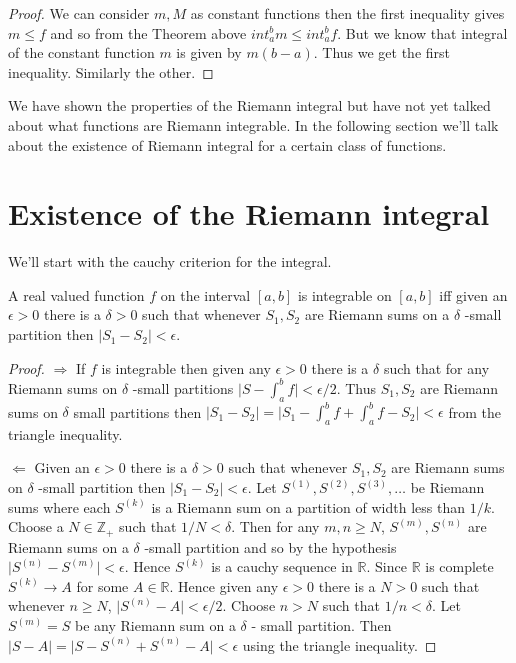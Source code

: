 \begin{proof}
    We can consider $m,M$ as constant functions then the first inequality gives $m \leq f$ and so
    from the Theorem above $int_a^b m \leq int_a^b f$. But we know that integral of the constant 
    function $m$ is given by $m(b-a)$. Thus we get the first inequality. Similarly the other.
\end{proof}
We have shown the properties of the Riemann integral but have not yet talked about what functions
are Riemann integrable. In the following section we'll talk about the existence of Riemann integral
for a certain class of functions.

\section{Existence of the Riemann integral}
We'll start with the cauchy criterion for the integral.
\begin{Lemma}
    A real valued function $f$ on the interval $\left[a,b\right]$ is integrable on
    $\left[a,b\right]$ iff given an $\epsilon > 0$ there is a $\delta > 0$ such that whenever 
    $S_1,S_2$ are Riemann sums on a $\delta$ -small partition then $\lvert S_1-S_2\rvert <
    \epsilon$. 
\end{Lemma}
\begin{proof}
    $\Rightarrow$ If $f$ is integrable then given any $\epsilon > 0$ there is a $\delta$ such that
for any Riemann sums on $\delta$ -small partitions $\lvert S - \int_a^b f \rvert < \epsilon/2$. Thus
$S_1,S_2$ are Riemann sums on $\delta$ small partitions then $\lvert S_1 - S_2 \rvert = \lvert S_1 -
\int_a^b f + \int_a^b f - S_2 \rvert < \epsilon $ from the triangle inequality.

$\Leftarrow$ Given an $\epsilon > 0$ there is a $\delta > 0$ such that whenever $S_1,S_2$ are
    Riemann sums on $\delta$ -small partition then $\lvert S_1 - S_2 \rvert < \epsilon$. Let
    $S^{(1)}, S^{(2)}, S^{(3)} , \dots $ be Riemann sums where each $S^{(k)}$ is a Riemann sum on a 
    partition of width less than $1/k$. Choose a $N \in \mathbb{Z_+}$ such that $1/N < \delta$. 
    Then for any $m,n \geq N$, $S^{(m)},S^{(n)}$ are Riemann sums on a $\delta$ -small partition and
    so by the hypothesis $\lvert S^{(n)} - S^{(m)} \rvert < \epsilon$. Hence $S^{(k)}$ is a cauchy
    sequence in $\mathbb{R}$. Since $\mathbb{R}$ is complete $S^{(k)} \to A$ for some $A \in
    \mathbb{R}$. Hence given any $\epsilon > 0$ there is a $N > 0$ such that whenever $n \geq N$,
    $\lvert S^{(n)} - A \rvert < \epsilon/2$. Choose $n > N $ such that $1/n < \delta$. 
    Let $S^{(m)} = S$ be any Riemann sum on a $\delta$ - small partition. 
    Then $\lvert S - A \rvert = \lvert S - S^{(n)} + S^{(n)} - A \rvert < \epsilon$
    using the triangle inequality. 
\end{proof}

